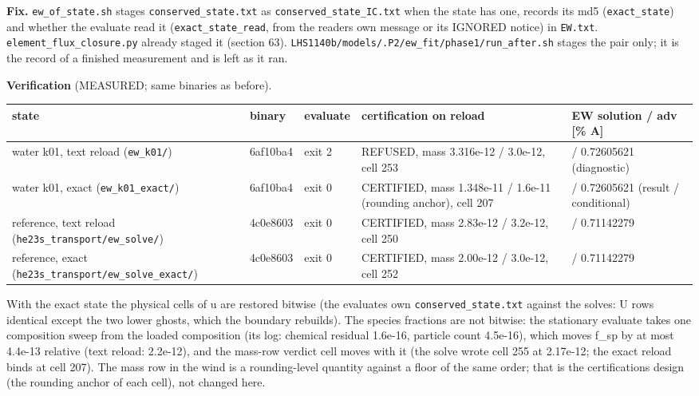 \documentclass[english,a4paper]{my_memo}
\begin{document}
\textbf{Fix.} \texttt{ew\_of\_state.sh} stages \texttt{conserved\_state.txt} as
\texttt{conserved\_state\_IC.txt} when the state has one, records its md5
(\texttt{exact\_state}) and whether the evaluate read it (\texttt{exact\_state\_read}, from
the reader\textquotesingle s own message or its IGNORED notice) in \texttt{EW.txt}.
\texttt{element\_flux\_closure.py} already staged it (section 63).
\texttt{LHS1140b/models/.P2/ew\_fit/phase1/run\_after.sh} stages the pair only; it
is the record of a finished measurement and is left as it ran.

\textbf{Verification} (MEASURED; same binaries as before).

{\def\LTcaptype{none} %
{\small
\begin{longtable}[]{@{}>{\raggedright\arraybackslash}p{\dimexpr(\linewidth-10\tabcolsep)/5\relax}>{\raggedright\arraybackslash}p{\dimexpr(\linewidth-10\tabcolsep)/5\relax}>{\raggedright\arraybackslash}p{\dimexpr(\linewidth-10\tabcolsep)/5\relax}>{\raggedright\arraybackslash}p{\dimexpr(\linewidth-10\tabcolsep)/5\relax}>{\raggedright\arraybackslash}p{\dimexpr(\linewidth-10\tabcolsep)/5\relax}@{}}
\toprule\noalign{}
state & binary & evaluate & certification on reload & EW solution / adv {[}\% A{]} \\
\midrule\noalign{}
\endhead
\bottomrule\noalign{}
\endlastfoot
water k01, text reload (\texttt{ew\_k01/}) & 6af10ba4 & exit 2 & REFUSED, mass 3.316e-12 / 3.0e-12, cell 253 & 0.74001762 / 0.72605621 (diagnostic) \\
water k01, exact (\texttt{ew\_k01\_exact/}) & 6af10ba4 & exit 0 & CERTIFIED, mass 1.348e-11 / 1.6e-11 (rounding anchor), cell 207 & 0.74001762 / 0.72605621 (result / conditional) \\
reference, text reload (\texttt{he23s\_transport/ew\_solve/}) & 4c0e8603 & exit 0 & CERTIFIED, mass 2.83e-12 / 3.2e-12, cell 250 & 0.73339944 / 0.71142279 \\
reference, exact (\texttt{he23s\_transport/ew\_solve\_exact/}) & 4c0e8603 & exit 0 & CERTIFIED, mass 2.00e-12 / 3.0e-12, cell 252 & 0.73339944 / 0.71142279 \\
\end{longtable}
}
}

With the exact state the physical cells of u are restored bitwise (the
evaluate\textquotesingle s own \texttt{conserved\_state.txt} against the solve\textquotesingle s: U rows identical
except the two lower ghosts, which the boundary rebuilds). The species
fractions are not bitwise: the stationary evaluate takes one composition
sweep from the loaded composition (its log: chemical residual 1.6e-16,
particle count 4.5e-16), which moves f\_sp by at most 4.4e-13 relative
(text reload: 2.2e-12), and the mass-row verdict cell moves with it (the
solve wrote cell 255 at 2.17e-12; the exact reload binds at cell 207). The
mass row in the wind is a rounding-level quantity against a floor of the
same order; that is the certification\textquotesingle s design (the rounding anchor of
each cell), not changed here.
\end{document}
